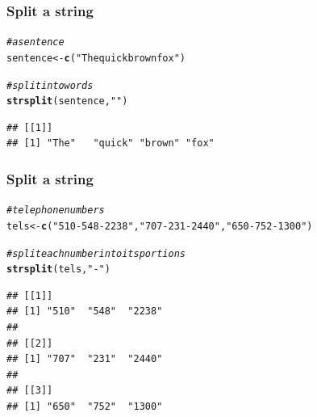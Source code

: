 \documentclass[12pt]{beamer}\usepackage[]{graphicx}\usepackage[]{color}
\makeatletter
\newcommand{\hlstr}[1]{\textcolor[rgb]{0.192,0.494,0.8}{#1}}%
\newcommand{\hlcom}[1]{\textcolor[rgb]{0.678,0.584,0.686}{\textit{#1}}}%
\newcommand{\hlstd}[1]{\textcolor[rgb]{0.345,0.345,0.345}{#1}}%
\newcommand{\hlkwb}[1]{\textcolor[rgb]{0.69,0.353,0.396}{#1}}%
\newcommand{\hlkwd}[1]{\textcolor[rgb]{0.737,0.353,0.396}{\textbf{#1}}}%
\newenvironment{kframe}{%
 \def\at@end@of@kframe{}%
 \ifinner\ifhmode%
  \def\at@end@of@kframe{\end{minipage}}%
  \begin{minipage}{\columnwidth}%
 \fi\fi%
 \def\FrameCommand##1{\hskip\@totalleftmargin \hskip-\fboxsep
 \colorbox{shadecolor}{##1}\hskip-\fboxsep
     \hskip-\linewidth \hskip-\@totalleftmargin \hskip\columnwidth}%
 \MakeFramed {\advance\hsize-\width
   \@totalleftmargin\z@ \linewidth\hsize
   \@setminipage}}%
 {\par\unskip\endMakeFramed%
 \at@end@of@kframe}
\newenvironment{knitrout}{}{} %
\makeatother
\begin{document}

\begin{frame}[fragile]
\frametitle{Split a string}

\begin{knitrout}\footnotesize
{}\color{fgcolor}\begin{kframe}
\begin{alltt}
\hlcom{# a sentence}
\hlstd{sentence} \hlkwb{<-} \hlkwd{c}\hlstd{(}\hlstr{"The quick brown fox"}\hlstd{)}

\hlcom{# split into words}
\hlkwd{strsplit}\hlstd{(sentence,} \hlstr{" "}\hlstd{)}
\end{alltt}
\begin{verbatim}
## [[1]]
## [1] "The"   "quick" "brown" "fox"
\end{verbatim}
\end{kframe}
\end{knitrout}

\end{frame}


\begin{frame}[fragile]
\frametitle{Split a string}

\begin{knitrout}\footnotesize
{}\color{fgcolor}\begin{kframe}
\begin{alltt}
\hlcom{# telephone numbers}
\hlstd{tels} \hlkwb{<-} \hlkwd{c}\hlstd{(}\hlstr{"510-548-2238"}\hlstd{,} \hlstr{"707-231-2440"}\hlstd{,} \hlstr{"650-752-1300"}\hlstd{)}

\hlcom{# split each number into its portions}
\hlkwd{strsplit}\hlstd{(tels,} \hlstr{"-"}\hlstd{)}
\end{alltt}
\begin{verbatim}
## [[1]]
## [1] "510"  "548"  "2238"
## 
## [[2]]
## [1] "707"  "231"  "2440"
## 
## [[3]]
## [1] "650"  "752"  "1300"
\end{verbatim}
\end{kframe}
\end{knitrout}

\end{frame}

\end{document}

